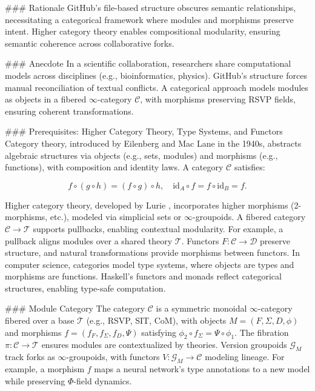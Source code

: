 \documentclass[12pt]{article}
\begin{document}
{### Rationale
GitHub’s file-based structure obscures semantic relationships, necessitating a categorical framework where modules and morphisms preserve intent. Higher category theory enables compositional modularity, ensuring semantic coherence across collaborative forks.

### Anecdote
In a scientific collaboration, researchers share computational models across disciplines (e.g., bioinformatics, physics). GitHub’s structure forces manual reconciliation of textual conflicts. A categorical approach models modules as objects in a fibered $\infty$-category $\mathcal{C}$, with morphisms preserving RSVP fields, ensuring coherent transformations.

### Prerequisites: Higher Category Theory, Type Systems, and Functors
Category theory, introduced by Eilenberg and Mac Lane in the 1940s, abstracts algebraic structures via objects (e.g., sets, modules) and morphisms (e.g., functions), with composition and identity laws. A category $\mathcal{C}$ satisfies:

\[
f \circ (g \circ h) = (f \circ g) \circ h, \quad \text{id}_A \circ f = f \circ \text{id}_B = f.
\]

Higher category theory, developed by Lurie \cite{lurie2009higher}, incorporates higher morphisms (2-morphisms, etc.), modeled via simplicial sets or $\infty$-groupoids. A fibered category $\mathcal{C} \to \mathcal{T}$ supports pullbacks, enabling contextual modularity. For example, a pullback aligns modules over a shared theory $\mathcal{T}$. Functors $F : \mathcal{C} \to \mathcal{D}$ preserve structure, and natural transformations provide morphisms between functors. In computer science, categories model type systems, where objects are types and morphisms are functions. Haskell’s functors and monads reflect categorical structures, enabling type-safe computation.

### Module Category
The category $\mathcal{C}$ is a symmetric monoidal $\infty$-category fibered over a base $\mathcal{T}$ (e.g., RSVP, SIT, CoM), with objects $M = (F, \Sigma, D, \phi)$ and morphisms $f = (f_F, f_\Sigma, f_D, \Psi)$ satisfying $\phi_2 \circ f_\Sigma = \Psi \circ \phi_1$. The fibration $\pi : \mathcal{C} \to \mathcal{T}$ ensures modules are contextualized by theories. Version groupoids $\mathcal{G}_M$ track forks as $\infty$-groupoids, with functors $V : \mathcal{G}_M \to \mathcal{C}$ modeling lineage. For example, a morphism $f$ maps a neural network’s type annotations to a new model while preserving $\Phi$-field dynamics.

}
\end{document}
